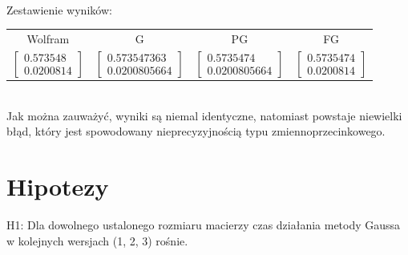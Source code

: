 \documentclass[11pt]{article}
\begin{document}
\\[1\baselineskip]
Zestawienie wyników:
\\[1\baselineskip]
\begin{tabular}{cccc}
Wolfram & G & PG & FG \\
$\begin{bmatrix}
    0.573548  \\
    0.0200814
\end{bmatrix}$ 
& 
$\begin{bmatrix}
    0.573547363  \\
    0.0200805664
\end{bmatrix}$ 
& 
$\begin{bmatrix}
    0.5735474  \\
    0.0200805664
\end{bmatrix}$ 
& 
$\begin{bmatrix}
    0.5735474  \\
   0.0200814
\end{bmatrix}$
\end{tabular}
\\[1\baselineskip]
Jak można zauważyć, wyniki są niemal identyczne, natomiast powstaje niewielki błąd, który jest spowodowany nieprecyzyjnością typu zmiennoprzecinkowego.
\newpage
\section{Hipotezy}
H1: Dla dowolnego ustalonego rozmiaru macierzy czas działania metody Gaussa w kolejnych
wersjach (1, 2, 3) rośnie.
\end{document}

